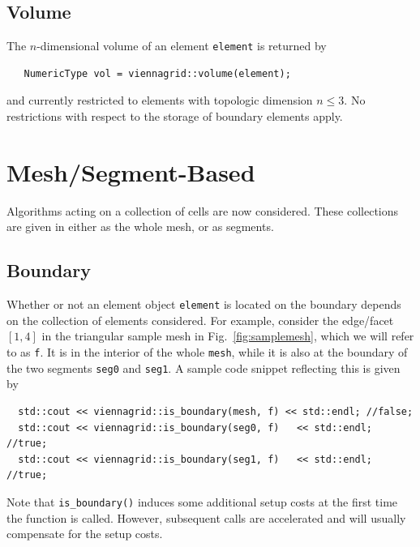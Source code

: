 
  \subsection{Volume}
  The $n$-dimensional volume of an element \lstinline|element| is returned by
  \begin{lstlisting}
   NumericType vol = viennagrid::volume(element);
  \end{lstlisting}
  and currently restricted to elements with topologic dimension $n \leq 3$. No restrictions with respect to the storage of boundary elements apply.


\section{Mesh/Segment-Based}
Algorithms acting on a collection of cells are now considered. These collections are given in {\ViennaGrid} either as the whole mesh, or as segments.

 \subsection{Boundary}
 Whether or not an element object \lstinline|element| is located on the boundary depends on the collection of elements considered.
 For example, consider the edge/facet $[1,4]$ in the triangular sample mesh in Fig.~\ref{fig:samplemesh}, which we will refer to as \lstinline|f|.
 It is in the interior of the whole \lstinline|mesh|, while it is also at the boundary of the two segments \lstinline|seg0| and \lstinline|seg1|.
 A sample code snippet reflecting this is given by
 \begin{lstlisting}
  std::cout << viennagrid::is_boundary(mesh, f) << std::endl; //false;
  std::cout << viennagrid::is_boundary(seg0, f)   << std::endl; //true;
  std::cout << viennagrid::is_boundary(seg1, f)   << std::endl; //true;
 \end{lstlisting}
 Note that \lstinline|is_boundary()| induces some additional setup costs at the first time the function is called. However, subsequent calls are accelerated and will usually compensate for the setup costs.



